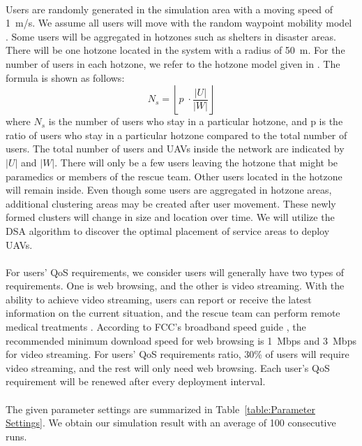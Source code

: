 \documentclass[a4paper,12pt]{report}
\begin{document}
\paragraph{}
Users are randomly generated in the simulation area with a moving speed of 1~m/s. We assume all users will move with the random waypoint mobility model \cite{b10}. Some users will be aggregated in hotzones such as shelters in disaster areas. There will be one hotzone located in the system with a radius of 50~m. For the number of users in each hotzone, we refer to the hotzone model given in \cite{b24}. The formula is shown as follows:
\begin{equation}
    N_{s} = \left\lfloor p\;\cdot\frac{|U|}{|W|} \right\rfloor
\end{equation}
where $N_{s}$ is the number of users who stay in a particular hotzone, and p is the ratio of users who stay in a particular hotzone compared to the total number of users. The total number of users and UAVs inside the network are indicated by $|U|$ and $|W|$. There will only be a few users leaving the hotzone that might be paramedics or members of the rescue team. Other users located in the hotzone will remain inside. Even though some users are aggregated in hotzone areas, additional clustering areas may be created after user movement. These newly formed clusters will change in size and location over time. We will utilize the DSA algorithm to discover the optimal placement of service areas to deploy UAVs.
\paragraph{}
For users' QoS requirements, we consider users will generally have two types of requirements. One is web browsing, and the other is video streaming. With the ability to achieve video streaming, users can report or receive the latest information on the current situation, and the rescue team can perform remote medical treatments \cite{b25}. According to FCC's broadband speed guide \cite{b26}, the recommended minimum download speed for web browsing is 1~Mbps and 3~Mbps for video streaming. For users' QoS requirements ratio, 30\% of users will require video streaming, and the rest will only need web browsing. Each user's QoS requirement will be renewed after every deployment interval.
\paragraph{}
The given parameter settings are summarized in Table~\ref{table:Parameter Settings}. We obtain our simulation result with an average of 100 consecutive runs.
\end{document}
